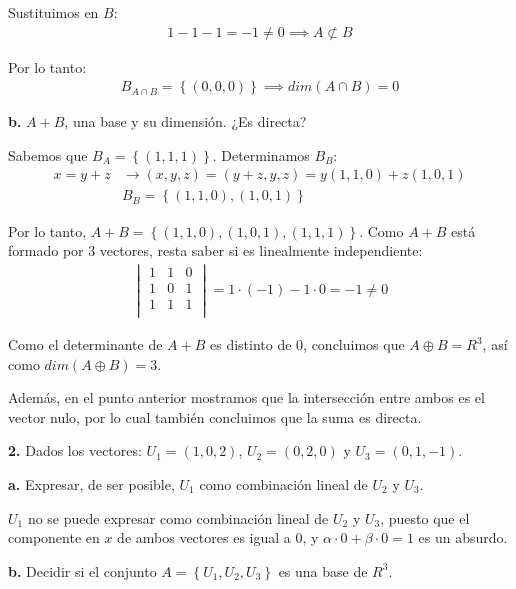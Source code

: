 \documentclass[12pt]{article}
\begin{document}
Sustituimos en \(B\):
\begin{align*}
  1 - 1 - 1 = -1 \neq 0 \implies A \not \subset B
\end{align*}

Por lo tanto:
\begin{align*}
  B_{A \cap B} = \left\{(0,0,0)\right\} \implies dim(A \cap B) = 0
\end{align*}

\hspace{6mm}\textbf{b.}
\(A + B\), una base y su dimensión. ¿Es directa?

Sabemos que \(B_{A} = \left\{(1,1,1)\right\}\).
Determinamos \(B_{B}\):
\begin{align*}
  x = y + z & \rightarrow (x,y,z) = (y+z,y,z) = y(1,1,0) + z(1,0,1) \\
            & \boxed{B_{B} = \left\{(1,1,0),(1,0,1)\right\}}
\end{align*}

Por lo tanto, \(A + B = \left\{(1,1,0),(1,0,1),(1,1,1)\right\}\).
Como \(A + B\) está formado por 3 vectores, resta saber si es linealmente
independiente:
\begin{align*}
  \begin{vmatrix}
    1 & 1 & 0 \\
    1 & 0 & 1 \\
    1 & 1 & 1 \\
  \end{vmatrix} = 1 \cdot (-1) - 1 \cdot 0 = \boxed{-1 \neq 0}
\end{align*}

Como el determinante de \(A + B\) es distinto de 0,
concluimos que \(A \oplus B = R^{3}\), así como \(dim(A\oplus B) = 3\).

Además, en el punto anterior mostramos que la intersección entre ambos
es el vector nulo, por lo cual también concluimos que la suma es directa.

\textbf{2.}
Dados los vectores:
\(U_{1} = (1,0,2)\),
\(U_{2} = (0,2,0)\) y
\(U_{3} = (0,1,-1)\).

\hspace{6mm}\textbf{a.}
Expresar, de ser posible, \(U_{1}\) como combinación lineal de \(U_{2}\) y
\(U_{3}\).

\(U_{1}\) no se puede expresar como combinación lineal de \(U_{2}\) y
\(U_{3}\), puesto que el componente en \(x\) de ambos vectores es igual a 0,
y \(\alpha\cdot 0 + \beta\cdot 0 = 1\) es un absurdo.

\hspace{6mm}\textbf{b.}
Decidir si el conjunto \(A = \left\{U_{1}, U_{2}, U_{3}\right\}\) es una base
de \(R^{3}\).
\end{document}
